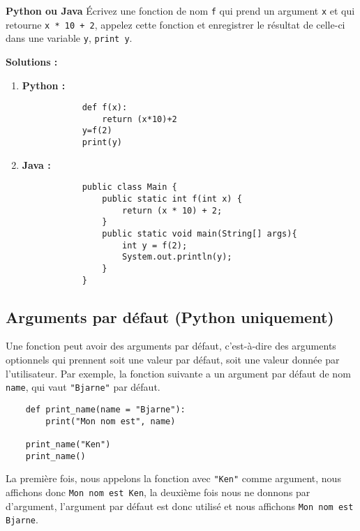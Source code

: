 \begin{Exercice}[5 minutes] \textbf{Python ou Java}
    Écrivez une fonction de nom \lstinline{f} qui prend un argument \lstinline{x} et qui retourne \lstinline{x * 10 + 2}, appelez cette fonction et enregistrer le résultat de celle-ci dans une variable \lstinline{y}, \lstinline{print y}.
    \begin{conseil}
        
    \end{conseil}
    \textbf{Solutions :}
    \begin{enumerate}
        \item \textbf{Python :}
        \begin{verbatim}
            def f(x):
                return (x*10)+2
            y=f(2)
            print(y)
        \end{verbatim}
        
        \item \textbf{Java :}
        \begin{verbatim}
            public class Main {
                public static int f(int x) {
                    return (x * 10) + 2;
                }
                public static void main(String[] args){
                    int y = f(2);
                    System.out.println(y);
                }
            }
        \end{verbatim}
    \end{enumerate}

\end{Exercice}

\subsection{Arguments par défaut (Python uniquement)}

Une fonction peut avoir des arguments par défaut, c'est-à-dire des arguments optionnels qui prennent soit une valeur par défaut, soit une valeur donnée par l'utilisateur. Par exemple, la fonction suivante a un argument par défaut de nom \lstinline{name}, qui vaut \lstinline{"Bjarne"} par défaut.
\begin{verbatim}
    def print_name(name = "Bjarne"):
        print("Mon nom est", name)
        
    print_name("Ken")
    print_name()
\end{verbatim}

La première fois, nous appelons la fonction avec \lstinline{"Ken"} comme argument, nous affichons donc \lstinline{Mon nom est Ken}, la deuxième fois nous ne donnons par d'argument, l'argument par défaut est donc utilisé et nous affichons \lstinline{Mon nom est Bjarne}.

